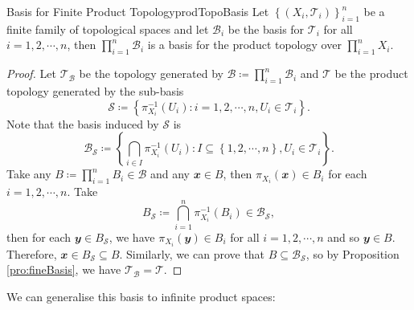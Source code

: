 \documentclass[math]{amznotes}
\theoremstyle{remark}
\begin{document}
\begin{probox}{Basis for Finite Product Topology}{prodTopoBasis}
    Let $\left\{\left(X_i, \mathcal{T}_i\right)\right\}_{i = 1}^n$ be a finite family of topological spaces and let $\mathcal{B}_i$ be the basis for $\mathcal{T}_i$ for all~$i = 1, 2, \cdots, n$, then $\prod_{i = 1}^{n}\mathcal{B}_i$ is a basis for the product topology over $\prod_{i = 1}^nX_i$.
    \tcblower
    \begin{proof}
        Let $\mathcal{T}_{\mathcal{B}}$ be the topology generated by $\mathcal{B} \coloneqq \prod_{i = 1}^{n}\mathcal{B}_i$ and $\mathcal{T}$ be the product topology generated by the sub-basis 
        \begin{equation*}
            \mathcal{S} \coloneqq \left\{\pi_{X_{i}}^{-1}\left(U_{i}\right) \colon i = 1, 2, \cdots, n, U_{i} \in \mathcal{T}_{i}\right\}.
        \end{equation*}
        Note that the basis induced by $\mathcal{S}$ is 
        \begin{equation*}
            \mathcal{B}_{\mathcal{S}} \coloneqq \left\{\bigcap_{i \in I}\pi_{X_{i}}^{-1}\left(U_{i}\right) \colon I \subseteq \left\{1, 2, \cdots, n\right\}, U_i \in \mathcal{T}_{i}\right\}.
        \end{equation*}
        Take any $B \coloneqq \prod_{i = 1}^{n}B_i \in \mathcal{B}$ and any $\mathbfit{x} \in B$, then $\pi_{X_i}\left(\mathbfit{x}\right) \in B_i$ for each $i = 1, 2, \cdots, n$. Take 
        \begin{equation*}
            B_{\mathcal{S}} \coloneqq \bigcap_{i = 1}^n\pi_{X_i}^{-1}\left(B_i\right) \in \mathcal{B}_{\mathcal{S}},
        \end{equation*}
        then for each $\mathbfit{y} \in B_{\mathcal{S}}$, we have $\pi_{X_i}\left(\mathbfit{y}\right) \in B_i$ for all $i = 1, 2, \cdots, n$ and so $\mathbfit{y} \in B$. Therefore, $\mathbfit{x} \in B_{\mathcal{S}} \subseteq B$. Similarly, we can prove that $B \subseteq \mathcal{B}_{\mathcal{S}}$, so by Proposition \ref{pro:fineBasis}, we have $\mathcal{T}_{\mathcal{B}} = \mathcal{T}$.
    \end{proof}
\end{probox}
We can generalise this basis to infinite product spaces:
\end{document}
